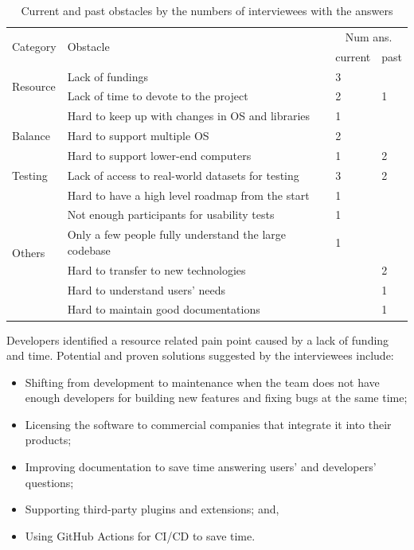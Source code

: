 \documentclass[final, 3p, times, authoryear]{elsarticle}
\begin{document}
\begin{table}[!ht]
\centering
\begin{tabular}{llll}
\toprule
\multirow{2}{*}{Category} & \multirow{2}{*}{Obstacle} & \multicolumn{2}{c}{Num ans.} \\ \cline{3-4} 
 &  & current & past \\ 
\midrule
\multirow{2}{*}{Resource} & Lack of fundings & 3 &  \\
 & Lack of time to devote to the project & 2 & 1 \\ 
\midrule
\multirow{3}{*}{Balance} & Hard to keep up with changes in OS and libraries & 1 &  \\
 & Hard to support multiple OS & 2 &  \\
 & Hard to support lower-end computers & 1 & 2 \\ 
\midrule
Testing & Lack of access to real-world datasets for testing & 3 & 2 \\ 
\midrule
\multirow{7}{*}{Others}
 & Hard to have a high level roadmap from the start & 1 &  \\
 & Not enough participants for usability tests & 1 &  \\
 & Only a few people fully understand the large codebase & 1 &  \\
 & Hard to transfer to new technologies & & 2 \\
 & Hard to understand users' needs & & 1 \\
 & Hard to maintain good documentations & & 1 \\ 
\bottomrule
\end{tabular}
\caption{\label{tab_obstacles}Current and past obstacles by the numbers of interviewees with the answers}
\end{table}

Developers identified a resource related pain point caused by a lack of funding
and time.  Potential and proven solutions suggested by the interviewees include:

\begin{itemize}
\item Shifting from development to maintenance when the team does not have
enough developers for building new features and fixing bugs at the same time;
\item Licensing the software to commercial companies that integrate it into
their products;
\item Improving documentation to save time answering users' and developers'
questions;
\item Supporting third-party plugins and extensions; and,
\item Using GitHub Actions for CI/CD to save time.
\end{itemize}
\end{document}
